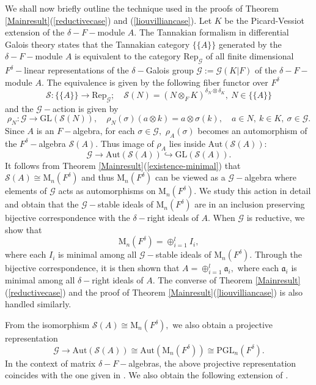 \documentclass[preprint, 11pt]{amsart}
\theoremstyle{corollary}
\theoremstyle{remark}
\theoremstyle{proposition}
\numberwithin{equation}{subsection}
\begin{document}
	We shall now briefly outline the technique used in the proofs of Theorem \ref{Mainresult}(\ref{reductivecase}) and (\ref{liouvilliancase}).  Let $K$ be the Picard-Vessiot extension of the $\delta-F-$module $A.$ The Tannakian formalism in differential Galois theory states that  the Tannakian category  $\{\{A\}\}$ generated by the  $\delta-F-$module $A$ is equivalent to the category $\mathrm{Rep}_{\mathscr{G}}$ of all finite dimensional $F^\delta-$linear representations of the $\delta-$Galois group $\mathscr G:=\mathscr{G}(K|F)$ of the $\delta-F-$module $A.$ The equivalence is given by the following fiber functor over $F^{\delta}$ $$\mathscr S: \{\{A\}\}\to \mathrm{Rep}_{\mathscr G}; \quad \mathscr S(N)=(N\otimes_F K)^{\delta_N\otimes\delta_K}, \ N\in \{\{A\}\}$$  and the $\mathscr G-$action is given by $$\rho_N: \mathscr G\to \mathrm{GL}(\mathscr S(N)), \quad \rho_N(\sigma)(a\otimes k)=a\otimes \sigma(k), \quad a\in N,\  k\in K, \ \sigma\in \mathscr G.$$    Since  $A$ is an $F-$algebra, for each $\sigma\in \mathscr G,$ $\rho_A(\sigma)$ becomes an automorphism of the $F^\delta-$algebra   $\mathscr S(A).$  Thus image of $\rho_A$ lies inside $\mathrm{Aut}(\mathscr S(A)):$ $$\mathscr G\to \mathrm{Aut}(\mathscr S(A))\hookrightarrow \mathrm{GL}(\mathscr S(A)).$$
It follows from Theorem \ref{Mainresult}(\ref{existence-minimal}) that  $\mathscr S(A)\cong \mathrm{M}_n(F^\delta)$ and thus $\mathrm{M}_n(F^\delta)$ can be viewed as a $\mathscr G-$algebra where elements of $\mathscr G$ acts as automorphisms on $\mathrm{M}_n(F^\delta).$ We study this action in detail and obtain that the $\mathscr G-$stable ideals of $\mathrm{M}_n(F^\delta)$ are in an inclusion preserving bijective correspondence with the $\delta-$right ideals of $A.$ When $\mathscr G$ is reductive, we show that  $$\mathrm{M}_n(F^\delta)=\oplus^l_{i=1} I_i,$$ where each $I_i$ is minimal among all $\mathscr G-$stable ideals of $\mathrm{M}_n(F^\delta).$ Through the bijective correspondence, it is then shown that $A=\oplus^l_{i=1}\mathfrak{a}_i,$ where each $\mathfrak a_i$ is  minimal among all $\delta-$right ideals of $A.$ The converse of Theorem \ref{Mainresult}(\ref{reductivecase}) and the proof of Theorem \ref{Mainresult}(\ref{liouvilliancase}) is also handled similarly. 

From the isomorphism $\mathscr S(A)\cong \mathrm{M}_n(F^\delta),$ we also obtain a projective representation $$\mathscr G\to \mathrm{Aut}(\mathscr S(A))\cong\mathrm{Aut}(\mathrm{M}_n(F^\delta))\cong \mathrm{PGL}_n(F^\delta).$$ In the context of matrix $\delta-F-$algebras, the above projective representation coincides with the one given in \cite[p.1914]{JM08}. We also obtain the following extension of \cite[Theorem 2]{JM08}.
\end{document}
